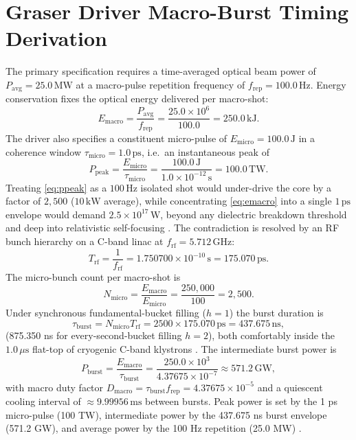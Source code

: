 \documentclass[10pt,journal,compsoc]{IEEEtran}
\newcommand{\MW}{\,\mathrm{MW}}
\newcommand{\kJ}{\,\mathrm{kJ}}
\newcommand{\ms}{\,\mathrm{ms}}
\newcommand{\ns}{\,\mathrm{ns}}
\newcommand{\ps}{\,\mathrm{ps}}
\newcommand{\mus}{\,\mu\mathrm{s}}
\newcommand{\GHz}{\,\mathrm{GHz}}
\newcommand{\GW}{\,\mathrm{GW}}
\newcommand{\TW}{\,\mathrm{TW}}
\begin{document}
\section{Graser Driver Macro-Burst Timing Derivation}
The primary specification requires a time-averaged optical beam power of
$P_{\mathrm{avg}} = 25.0\MW$ at a macro-pulse repetition frequency of
$f_{\mathrm{rep}} = 100.0\,\mathrm{Hz}$. Energy conservation fixes the
optical energy delivered per macro-shot:
\begin{equation}
E_{\mathrm{macro}} = \frac{P_{\mathrm{avg}}}{f_{\mathrm{rep}}}
 = \frac{25.0\times10^{6}}{100.0} = 250.0\kJ.
\label{eq:emacro}
\end{equation}
The driver also specifies a constituent micro-pulse of
$E_{\mathrm{micro}} = 100.0\,\mathrm{J}$ in a coherence window
$\tau_{\mathrm{micro}} = 1.0\ps$, i.e.\ an instantaneous peak of
\begin{equation}
P_{\mathrm{peak}} = \frac{E_{\mathrm{micro}}}{\tau_{\mathrm{micro}}}
 = \frac{100.0\,\mathrm{J}}{1.0\times10^{-12}\,\mathrm{s}} = 100.0\TW.
\label{eq:ppeak}
\end{equation}
Treating \eqref{eq:ppeak} as a $100\,\mathrm{Hz}$ isolated shot would
under-drive the core by a factor of $2{,}500$ ($10\,\mathrm{kW}$ average),
while concentrating \eqref{eq:emacro} into a single $1\ps$ envelope would
demand $2.5\times10^{17}\,\mathrm{W}$, beyond any dielectric breakdown
threshold and deep into relativistic self-focusing
\cite{mourou2018,plasma_mirrors2018}. The contradiction is resolved by an
RF bunch hierarchy on a C-band linac at
$f_{\mathrm{rf}} = 5.712\GHz$:
\begin{equation}
T_{\mathrm{rf}} = \frac{1}{f_{\mathrm{rf}}}
 = 1.750700\times10^{-10}\,\mathrm{s} = 175.070\ps.
\end{equation}
The micro-bunch count per macro-shot is
\begin{equation}
N_{\mathrm{micro}} = \frac{E_{\mathrm{macro}}}{E_{\mathrm{micro}}}
 = \frac{250{,}000}{100} = 2{,}500.
\end{equation}
Under synchronous fundamental-bucket filling ($h=1$) the burst duration is
\begin{equation}
\tau_{\mathrm{burst}} = N_{\mathrm{micro}} T_{\mathrm{rf}}
 = 2500\times 175.070\ps = 437.675\ns,
\end{equation}
(875.350 ns for every-second-bucket filling $h=2$), both comfortably inside
the $1.0\mus$ flat-top of cryogenic C-band klystrons \cite{bes2009}. The
intermediate burst power is
\begin{equation}
P_{\mathrm{burst}} = \frac{E_{\mathrm{macro}}}{\tau_{\mathrm{burst}}}
 = \frac{250.0\times10^{3}}{4.37675\times10^{-7}}
 \approx 571.2\GW,
\end{equation}
with macro duty factor
$D_{\mathrm{macro}} = \tau_{\mathrm{burst}} f_{\mathrm{rep}}
 = 4.37675\times10^{-5}$ and a quiescent cooling interval of
$\approx 9.99956\ms$ between bursts. Peak power is set by the 1 ps
micro-pulse (100 TW), intermediate power by the 437.675 ns burst envelope
(571.2 GW), and average power by the 100 Hz repetition (25.0 MW)
\cite{campri2022,mdpi_fel2022,muggli2021,bnl_atf2020}.
\end{document}

